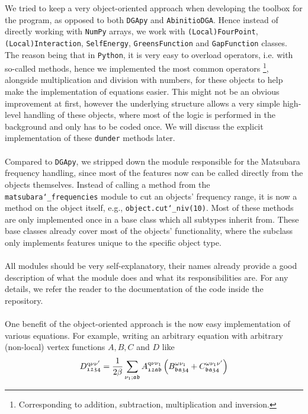 \documentclass[../../main.tex]{subfiles}
\begin{document}
We tried to keep a very object-oriented approach when developing the toolbox for the program, as opposed to both \texttt{DGApy} and \texttt{AbinitioDGA}. Hence instead of directly working with \texttt{NumPy} arrays, we work with \texttt{(Local)FourPoint}, \texttt{(Local)Interaction}, \texttt{SelfEnergy}, \texttt{GreensFunction} and \texttt{GapFunction} classes. The reason being that in \texttt{Python}, it is very easy to overload operators, i.e. with so-called  methods, hence we implemented the most common operators \footnote{Corresponding to addition, subtraction, multiplication and inversion.}, alongside multiplication and division with numbers, for these objects to help make the implementation of equations easier. This might not be an obvious improvement at first, however the underlying structure allows a very simple high-level handling of these objects, where most of the logic is performed in the background and only has to be coded once. We will discuss the explicit implementation of these \texttt{dunder} methods later.
\\\\
Compared to \texttt{DGApy}, we stripped down the module responsible for the Matsubara frequency handling, since most of the features now can be called directly from the objects themselves. Instead of calling a method from the \texttt{matsubara\char`_frequencies} module to cut an objects' frequency range, it is now a method on the object itself, e.g., \texttt{object.cut\char`_niv(10)}. Most of these methods are only implemented once in a base class which all subtypes inherit from. These base classes already cover most of the objects' functionality, where the subclass only implements features unique to the specific object type.
\\\\
All modules should be very self-explanatory, their names already provide a good description of what the module does and what its responsibilities are. For any details, we refer the reader to the documentation of the code inside the repository.
\\\\
One benefit of the object-oriented approach is the now easy implementation of various equations. For example, writing an arbitrary equation with arbitrary (non-local) vertex functions $A,B,C$ and $D$ like
\begin{align}
	D^{\text{q}\nu\nu'}_{\mathfrak{1234}}=\frac{1}{2\beta} \sum_{\nu_1;\mathfrak{ab}} A^{\text{q}\nu\nu_1}_{\mathfrak{12ab}}\left (B^{\omega\nu_1}_{\mathfrak{ba34}}+C^{\omega\nu_1\nu'}_{\mathfrak{ba34}}\right )
\end{align}
\end{document}
